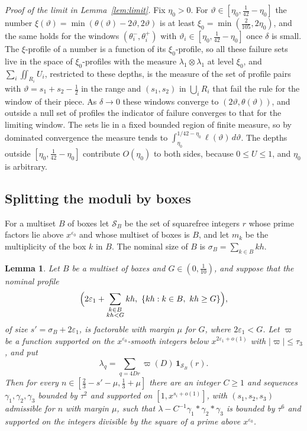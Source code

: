\documentclass[aps,prd,twocolumn,superscriptaddress,nofootinbib,longbibliography,floatfix,showkeys,nobalancelastpage,amsmath,amssymb,10pt]{revtex4-2}
\theoremstyle{plain}
\newtheorem{lemma}[theorem]{Lemma}
\theoremstyle{definition}
\theoremstyle{plain}
\newcommand{\eps}{\varepsilon}
\newcommand{\one}{\mathbf{1}}
\begin{document}
\emph{Proof of the limit in Lemma~\ref{lem:limit}.} Fix $\eta_0>0$. For $\vartheta\in[\eta_0,\frac1{42}-\eta_0]$ the number $\xi(\vartheta)=\min(\theta(\vartheta)-2\vartheta,2\vartheta)$ is at least $\xi_0=\min(\frac2{105},2\eta_0)$, and the same holds for the windows $(\theta_i^-,\theta_i^+)$ with $\vartheta_i\in[\eta_0,\frac1{42}-\eta_0]$ once $\delta$ is small. The $\xi$-profile of a number is a function of its $\xi_0$-profile, so all these failure sets live in the space of $\xi_0$-profiles with the measure $\lambda_1\otimes\lambda_1$ at level $\xi_0$, and $\sum_i\iint_{R_i}U_i$, restricted to these depths, is the measure of the set of profile pairs with $\vartheta=s_1+s_2-\frac12$ in the range and $(s_1,s_2)$ in $\bigcup_iR_i$ that fail the rule for the window of their piece. As $\delta\to0$ these windows converge to $(2\vartheta,\theta(\vartheta))$, and outside a null set of profiles the indicator of failure converges to that for the limiting window. The sets lie in a fixed bounded region of finite measure, so by dominated convergence the measure tends to $\int_{\eta_0}^{1/42-\eta_0}\ell(\vartheta)\,d\vartheta$. The depths outside $[\eta_0,\frac1{42}-\eta_0]$ contribute $O(\eta_0)$ to both sides, because $0\le U\le1$, and $\eta_0$ is arbitrary.

\subsection{Splitting the moduli by boxes}\label{app:boxes}

For a multiset $B$ of boxes let $\mathcal S_B$ be the set of squarefree integers $r$ whose prime factors lie above $x^{\eps_0}$ and whose multiset of boxes is $B$, and let $m_k$ be the multiplicity of the box $k$ in $B$. The nominal size of $B$ is $\sigma_B=\sum_{k\in B}kh$.

\begin{lemma}\label{lem:boxes}
Let $B$ be a multiset of boxes and $G\in(0,\frac1{10})$, and suppose that the nominal profile
\[
\Bigl(2\eps_1+\sum_{\substack{k\in B\\kh<G}}kh,\ \{kh:k\in B,\ kh\ge G\}\Bigr),
\]
of size $s'=\sigma_B+2\eps_1$, is factorable with margin $\mu$ for $G$, where $2\eps_1<G$. Let $\varpi$ be a function supported on the $x^{\eps_0}$-smooth integers below $x^{2\eps_1+o(1)}$ with $|\varpi|\le\tau_3$, and put
\[
\lambda_q=\sum_{q=4Dr}\varpi(D)\,\one_{\mathcal S_B}(r).
\]
Then for every $n\in[\frac23-s'-\mu,\frac13+\mu]$ there are an integer $C\ge1$ and sequences $\gamma_1,\gamma_2,\gamma_3$ bounded by $\tau^2$ and supported on $[1,x^{s_i+o(1)}]$, with $(s_1,s_2,s_3)$ admissible for $n$ with margin $\mu$, such that $\lambda-C^{-1}\gamma_1*\gamma_2*\gamma_3$ is bounded by $\tau^6$ and supported on the integers divisible by the square of a prime above $x^{\eps_0}$.
\end{lemma}
\end{document}
